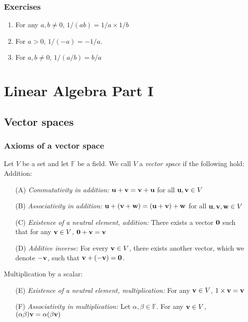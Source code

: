 \documentclass{article}
\begin{document}
\subsubsection{Exercises}
\begin{enumerate}
\item For any $a,b \neq 0$, $1/(ab) = 1/a \times 1/b$
\item For $a > 0$, $1/(-a) = -1/a$.
\item For $a, b \neq 0$, $1/(a/b) = b/a$
\end{enumerate}

\section{Linear Algebra Part I}

\subsection{Vector spaces}
\subsubsection{Axioms of a vector space}
Let $V$ be a set and let $\mathbb{F}$ be a field. We call $V$ a \emph{vector space} if the following hold: \\
Addition:
\begin{enumerate}
\setlength\itemsep{0.1em}
    \item[(A)] \textit{Commutativity in addition:} ${\mathbf{u}} + {\mathbf{v}} = {\mathbf{v}} + {\mathbf{u}}$ for all ${\mathbf{u}}, {\mathbf{v}} \in V$
    \item[(B)] \textit{Associativity in addition:} ${\mathbf{u}} + ({\mathbf{v}} + {\mathbf{w}}) = ({\mathbf{u}} + {\mathbf{v}}) + {\mathbf{w}}$ for all ${\mathbf{u}}, {\mathbf{v}}, {\mathbf{w}} \in V$
    \item[(C)] \textit{Existence of a neutral element, addition:} There exists a vector ${\mathbf{0}}$ such that for any ${\mathbf{v}} \in V$, ${\mathbf{0}} + {\mathbf{v}} = {\mathbf{v}}$
    \item[(D)] \textit{Additive inverse:} For every ${\mathbf{v}} \in V$, there exists another vector, which we denote $-{\mathbf{v}}$, such that ${\mathbf{v}} + (-{\mathbf{v}}) = {\mathbf{0}}$.
\end{enumerate}

Multiplication by a scalar:

\begin{enumerate}
\setlength\itemsep{0.1em}
    \item[(E)] \textit{Existence of a neutral element, multiplication:} For any ${\mathbf{v}} \in V$, $1\times {\mathbf{v}} = {\mathbf{v}}$
    \item[(F)] \textit{Associativity in multiplication:} Let $\alpha, \beta \in \mathbb{F}$. For any ${\mathbf{v}} \in V$, $(\alpha \beta) {\mathbf{v}} = \alpha (\beta {\mathbf{v}})$ 
\end{enumerate}
\end{document}
